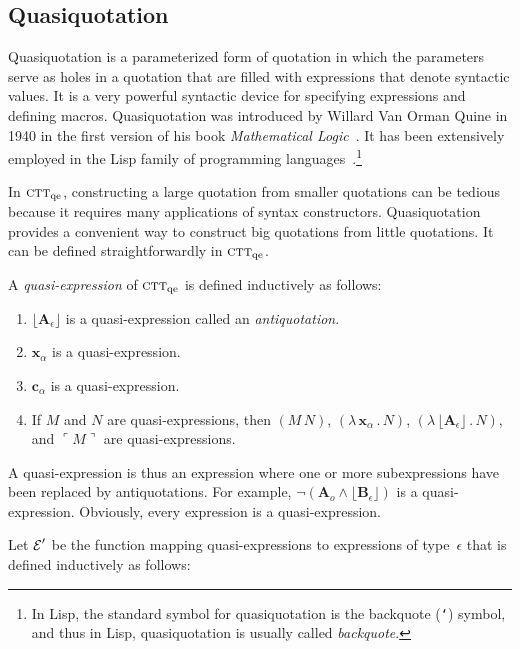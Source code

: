 \documentclass[fleqn]{llncs}
\newcommand{\be}{\begin{enumerate}}
\newcommand{\ee}{\end{enumerate}}
\newcommand{\sE}{\mbox{$\cal E$}}
\newcommand{\churchqe}{$\mbox{\sc ctt}_{\rm qe}$}
\newcommand{\synbrack}[1]{\ulcorner#1\urcorner}
\newcommand{\commabrack}[1]{\lfloor#1\rfloor}
\newcommand{\mdot}{\mathrel.}
\newcommand{\LambdaApp}{\lambda\,}
\newcommand{\Neg}{\neg}
\newcommand{\Andd}{\wedge}
\begin{document}
\subsection{Quasiquotation}

Quasiquotation is a parameterized form of quotation in which the
parameters serve as holes in a quotation that are filled with
expressions that denote syntactic values.  It is a very powerful
syntactic device for specifying expressions and defining macros.
Quasiquotation was introduced by Willard Van Orman Quine in 1940 in
the first version of his book \emph{Mathematical
  Logic}~\cite{Quine03}.  It has been extensively employed in the Lisp
family of programming languages~\cite{Bawden99}.\footnote{In Lisp, the
  standard symbol for quasiquotation is the backquote (\texttt{`})
  symbol, and thus in Lisp, quasiquotation is usually called
  \emph{backquote}.}

In {\churchqe}, constructing a large quotation from smaller quotations
can be tedious because it requires many applications of syntax
constructors.  Quasiquotation provides a convenient way to construct
big quotations from little quotations.  It can be defined
straightforwardly in {\churchqe}.

A \emph{quasi-expression} of {\churchqe} is defined inductively as
follows:

\be

  \item $\commabrack{\textbf{A}_\epsilon}$ is a quasi-expression
    called an \emph{antiquotation}.

  \item $\textbf{x}_\alpha$ is a quasi-expression.

  \item $\textbf{c}_\alpha$ is a quasi-expression.

  \item If $M$ and $N$ are quasi-expressions, then $(M \, N)$,
    $(\LambdaApp \textbf{x}_\alpha \mdot N)$, $(\LambdaApp
    \commabrack{\textbf{A}_\epsilon} \mdot N)$, and $\synbrack{M}$ are
    quasi-expressions.

\ee

\noindent
A quasi-expression is thus an expression where one or more
subexpressions have been replaced by antiquotations.  For example,
$\Neg(\textbf{A}_o \Andd \commabrack{\textbf{B}_\epsilon})$ is a
quasi-expression.  Obviously, every expression is a quasi-expression.

Let $\sE'$ be the function mapping quasi-expressions to expressions
of type~$\epsilon$ that is defined inductively as follows:
\end{document}
